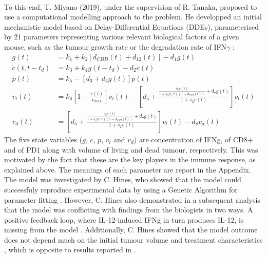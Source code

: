 \documentclass[11pt]{article}
\begin{document}
~ %
\par To this end, T. Miyano (2019), under the supervision of R. Tanaka, proposed to use a computational modelling approach to the problem. He developped an initial mechanistic model based on Delay-Differential Equations (DDEs), parameterised by 21 parameters representing various relevant biological factors of a given mouse, such as the tumour growth rate or the degradation rate of IFN$\gamma$ \cite{takuya}: 
\begin{align*}
    \dot{g}(t) &= k_1 + k_2 [d_{CBD}(t) + d_{12}(t)] - d_1g(t) \\ 
    \dot{c}(t,t-t_d) &= k_3 + k_4g(t-t_d)-d_2c(t) \\ 
    \dot{p}(t) &= k_5 - [d_3 + d_4g(t)]p(t) \\ 
    \dot{v}_l(t) &= k_6\left[1 - \frac{v(t)}{v_{max}} \right]v_l(t) - \left[d_5 + \frac{\frac{d_6c(t)}{1+s_1p(t)(1-d_{CPI}(t))}+d_7g(t)}{1+s_2v(t)}\right]v_l(t)\\
    \dot{v}_d(t) &= \left[d_5 + \frac{\frac{d_6c(t)}{1+s_1p(t)(1-d_{CPI}(t))}+d_7g(t)}{1+s_2v(t)}\right]v_l(t) - d_8 v_d(t)
\end{align*}
The five state variables ($g$, $c$, $p$, $v_l$ and $v_d$) are concentration of IFNg, of CD8+ and of PD1 along with volume of living and dead tumour, respectively. This was motivated by the fact that these are the key players in the immune response, as explained above. The meanings of each parameter are report in the Appendix. The model was investigated by C. Hines, who showed that the model could successfuly reproduce experimental data by using a Genetic Algorithm for parameter fitting \cite{christian1}. However, C. Hines also demonstrated in a subsequent analysis that the model was conflicting with findings from the biologists in two ways. A positive feedback loop, where IL-12-induced IFNg in turn produces IL-12, is missing from the model \cite{christian2}. Additionally, C. Hines showed that the model outcome does not depend much on the initial tumour volume and treatment characteristics \cite{christian1}, which is opposite to results reported in \cite{cbdil12}.
\end{document}
